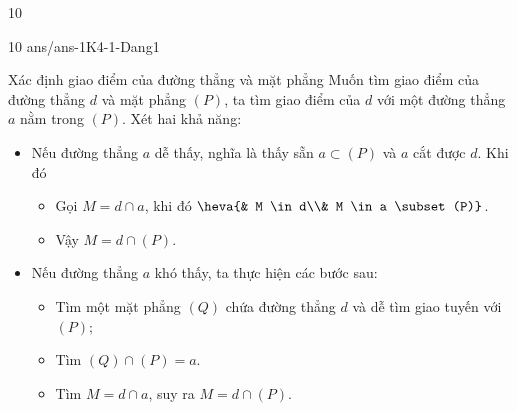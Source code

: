\begin{indapan}{10}
\begin{indapan}{10}
	{ans/ans-1K4-1-Dang1}
\end{indapan}
\begin{dang}{Xác định giao điểm của đường thẳng và mặt phẳng}
	Muốn tìm giao điểm của đường thẳng $d$ và mặt phẳng $(P)$, ta tìm giao điểm của $d$ với một đường thẳng $a$ nằm trong $(P)$. Xét hai khả năng:
	\begin{itemize}
		\item [\ding{172}] Nếu đường thẳng $a$ dễ thấy, nghĩa là thấy sẵn $a \subset (P)$ và $a$ cắt được $d$. Khi đó
		\begin{itemize}
			\item [$\bullet$] Gọi $M=d \cap a$, khi đó $\heva{& M \in d\\& M \in a \subset (P)}$.
			\item [$\bullet$] Vậy $M = d \cap (P)$.
		\end{itemize}
		\item [\ding{173}] Nếu đường thẳng $a$ khó thấy, ta thực hiện các bước sau:
		\begin{itemize}
			\item [$\bullet$] Tìm một mặt phẳng $(Q)$ chứa đường thẳng $d$ và dễ tìm giao tuyến với $(P)$;
			\item [$\bullet$] Tìm $(Q) \cap (P)= a$.
			\item [$\bullet$] Tìm $M=d \cap a$, suy ra $M = d \cap (P)$.
		\end{itemize}
	\end{itemize}
\end{dang}

\end{indapan}
